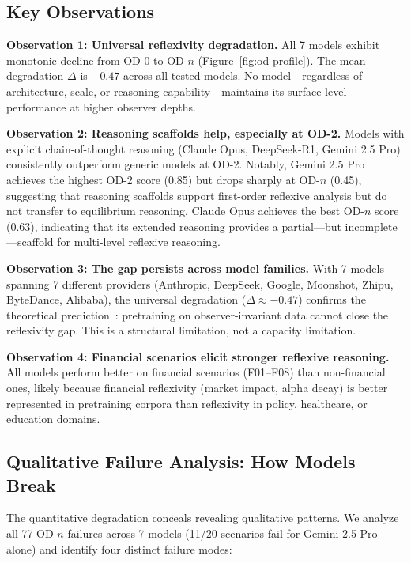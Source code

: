 \documentclass{article}
\begin{document}
\subsection{Key Observations}

\textbf{Observation 1: Universal reflexivity degradation.} All 7 models exhibit monotonic decline from OD-0 to OD-$n$ (Figure~\ref{fig:od-profile}). The mean degradation $\Delta$ is $-0.47$ across all tested models. No model---regardless of architecture, scale, or reasoning capability---maintains its surface-level performance at higher observer depths.

\textbf{Observation 2: Reasoning scaffolds help, especially at OD-2.} Models with explicit chain-of-thought reasoning (Claude Opus, DeepSeek-R1, Gemini 2.5 Pro) consistently outperform generic models at OD-2. Notably, Gemini 2.5 Pro achieves the highest OD-2 score (0.85) but drops sharply at OD-$n$ (0.45), suggesting that reasoning scaffolds support first-order reflexive analysis but do not transfer to equilibrium reasoning. Claude Opus achieves the best OD-$n$ score (0.63), indicating that its extended reasoning provides a partial---but incomplete---scaffold for multi-level reflexive reasoning.

\textbf{Observation 3: The gap persists across model families.} With 7 models spanning 7 different providers (Anthropic, DeepSeek, Google, Moonshot, Zhipu, ByteDance, Alibaba), the universal degradation ($\Delta \approx -0.47$) confirms the theoretical prediction~\citep{zhang2026}: pretraining on observer-invariant data cannot close the reflexivity gap. This is a structural limitation, not a capacity limitation.

\textbf{Observation 4: Financial scenarios elicit stronger reflexive reasoning.} All models perform better on financial scenarios (F01--F08) than non-financial ones, likely because financial reflexivity (market impact, alpha decay) is better represented in pretraining corpora than reflexivity in policy, healthcare, or education domains.

\subsection{Qualitative Failure Analysis: How Models Break}

The quantitative degradation conceals revealing qualitative patterns. We analyze all 77 OD-$n$ failures across 7 models (11/20 scenarios fail for Gemini 2.5 Pro alone) and identify four distinct failure modes:
\end{document}
